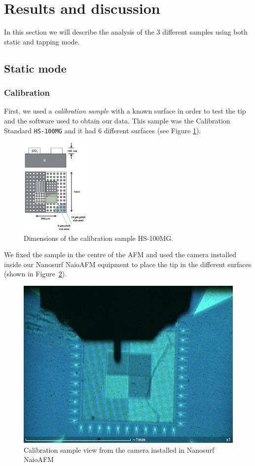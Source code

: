 \documentclass[11pt,a4paper]{article}
\begin{document}
\section{Results and discussion}
In this section we will describe the analysis of the 3 different samples using both static and tapping mode.

\subsection{Static mode}
\subsubsection{Calibration}
First, we used a \emph{calibration sample} with a known surface in order to test the tip and the software used to obtain our data. This sample was the Calibration Standard \texttt{HS-100MG} and it had 6 different surfaces (see Figure \ref{fig:HS-100MG}).

\begin{figure}[H]
\centering
\includegraphics[width=0.3\textwidth]{HS-100MG}
\caption{Dimensions of the calibration sample HS-100MG.}
\label{fig:HS-100MG}
\end{figure}

We fixed the sample in the centre of the AFM and used the camera installed inside our Nanosurf NaioAFM equipment to place the tip in the different surfaces (shown in Figure~\ref{fig:cal_sam}).

\begin{figure}[ht]
\centering
\includegraphics[scale=0.4]{calibration_sample.JPG}
\caption{Calibration sample view from the camera installed in Nanosurf NaioAFM}
\label{fig:cal_sam}
\end{figure}
\end{document}
